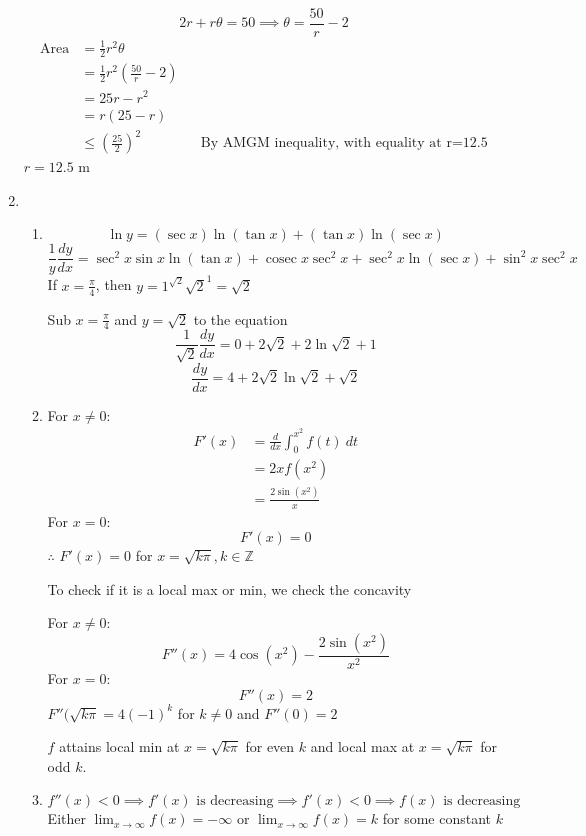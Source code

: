 \documentclass[12pt]{article}
\DeclareMathOperator{\cosec}{cosec}
\theoremstyle{definition}
\begin{document}
\begin{enumerate}
        \[2r+r\theta=50 \implies \theta = \frac{50}{r} -2\]
        \begin{align*}
          \text{Area} &= \frac{1}{2}r^2\theta \\
            &= \frac{1}{2}r^2\left(\frac{50}{r}-2\right) \\
            &= 25r - r^2 \\
            &= r(25-r) \\
            &\leq \left(\frac{25}{2}\right)^2 && \text{By AMGM inequality, with equality at r=12.5}
        \end{align*}
        $r=12.5$ m
  \item \begin{enumerate}[label=(\alph*)]
          \item \[\ln y = (\sec x)\ln(\tan x) + (\tan x)\ln(\sec x)\]
                \[\frac{1}{y}\frac{dy}{dx} = \sec^2 x\sin x \ln(\tan x) + \cosec x \sec^2 x + \sec^2 x \ln (\sec x) + \sin^2 x\sec^2 x\]
                If $x=\frac{\pi}{4}$, then $y=1^{\sqrt{2}}\sqrt{2}^1=\sqrt{2}$
                
                Sub $x=\frac{\pi}{4}$ and $y=\sqrt{2}$ to the equation
                \[\frac{1}{\sqrt{2}}\frac{dy}{dx} = 0 + 2\sqrt{2} + 2\ln\sqrt{2} +1\]
                \[\frac{dy}{dx} = 4+2\sqrt{2}\ln\sqrt{2}+\sqrt{2}\]
          \item For $x\neq 0$:
                \begin{align*}
                  F'(x) &= \frac{d}{dx}\int_0^{x^2}f(t)\ dt \\
                    &= 2xf(x^2) \\
                    &= \frac{2\sin(x^2)}{x} 
                \end{align*}
                For $x = 0$:
                \[F'(x) = 0\]
                $\therefore$ $F'(x)=0$ for $x=\sqrt{k\pi},k\in \mathbb{Z}$
                
                To check if it is a local max or min, we check the concavity
                
                For $x\neq 0$:
                \[F''(x) = 4\cos(x^2)-\frac{2\sin(x^2)}{x^2}\]
                For $x=0$:
                \[F''(x) = 2\]
                $F''(\sqrt{k\pi} = 4(-1)^k$ for $k\neq 0$ and $F''(0) = 2$
                
                $f$ attains local min at $x=\sqrt{k\pi}$ for even $k$ and local max at $x=\sqrt{k\pi}$ for odd $k$.
          \item \[f''(x)<0 \implies f'(x)\text{ is decreasing} \implies f'(x)<0 \implies f(x)\text{ is decreasing}\]
                Either $\lim_{x\to \infty}f(x)=-\infty$ or $\lim_{x\to \infty}f(x)=k$ for some constant $k$
                

\end{enumerate}
\end{enumerate}
\end{document}
